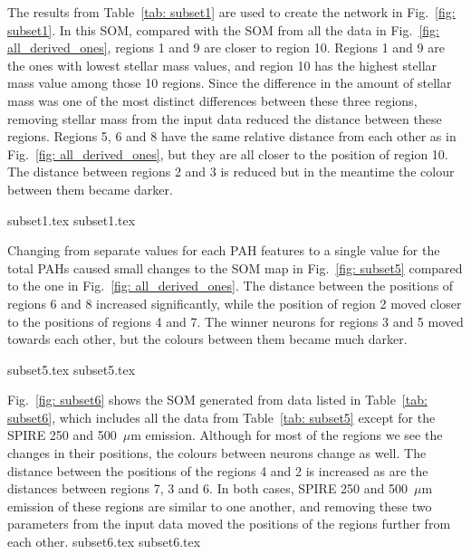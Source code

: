             The results from Table~\ref{tab: subset1} are used to create the network in Fig.~\ref{fig: subset1}. 
            In this SOM, compared with the SOM from all the data in Fig.~\ref{fig: all_derived_ones}, regions 1 and 9 are closer to region 10. 
            Regions 1 and 9 are the ones with lowest stellar mass values, and region 10 has the highest stellar mass value among those 10 regions. 
            Since the difference in the amount of stellar mass was one of the most distinct differences between these three regions, removing stellar mass from the input data reduced the distance between these regions.
            Regions 5, 6 and 8 have the same relative distance from each other as in Fig.~\ref{fig: all_derived_ones}, but they are all closer to the position of region 10.
            The distance between regions 2 and 3 is reduced but in the meantime the colour between them became darker.

            {subset1.tex}
            {subset1.tex}

            Changing from separate values for each PAH features to a single value for the total PAHs caused small changes to the SOM map in Fig.~\ref{fig: subset5} compared to the one in Fig.~\ref{fig: all_derived_ones}. 
            The distance between the positions of regions 6 and 8 increased significantly, while the position of region 2 moved closer to the positions of regions 4 and 7.
            The winner neurons for regions 3 and 5 moved towards each other, but the colours between them became much darker. 

            {subset5.tex}
            {subset5.tex}

            Fig.~\ref{fig: subset6} shows the SOM generated from data listed in Table~\ref{tab: subset6}, which includes all the data from Table~\ref{tab: subset5} except for  the SPIRE 250 and 500~$\mu$m emission.
            Although for most of the regions we see the changes in their positions, the colours between neurons change as well. 
            The distance between the positions of the regions 4 and 2 is increased as are the
            distances between regions 7, 3 and 6.
            In both cases, SPIRE 250 and 500~$\mu$m emission of these regions are similar to one another, and removing these two parameters from the input data moved the positions of the regions further from each other. 
            {subset6.tex}
            {subset6.tex}
            
